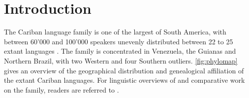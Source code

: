\section{Introduction}
\label{sec:intro}
The Cariban language family is one of the largest of South America, with between 60'000 and 100'000 speakers unevenly distributed between 22 to 25 extant languages \parencite[441]{gildea2012classification}.
The family is concentrated in Venezuela, the Guianas and Northern Brazil, with two Western and four Southern outliers.
\cref{fig:phylomap} gives an overview of the geographical distribution and genealogical affiliation of the extant Cariban languages.
For linguistic overviews of and  comparative work on the family, readers are referred to \textcites{gildea1998}{derbyshire1999carib}{meira2002first}{meira2005southern}{meira2006cariban}{gildea2007greenberg}{meira2010origin}{gildea2010story}{gildea2012classification}{matter2021cariban}{gildea2019overview}.






